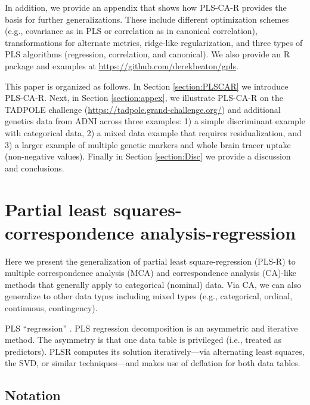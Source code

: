 \documentclass[12pt]{article}
\begin{document}
In addition, we provide an appendix that shows how PLS-CA-R provides the
basis for further generalizations. These include different optimization
schemes (e.g., covariance as in PLS or correlation as in canonical
correlation), transformations for alternate metrics, ridge-like
regularization, and three types of PLS algorithms (regression,
correlation, and canonical). We also provide an R package and examples
at \url{https://github.com/derekbeaton/gpls}.

This paper is organized as follows. In Section \ref{section:PLSCAR} we
introduce PLS-CA-R. Next, in Section \ref{section:appex}, we illustrate
PLS-CA-R on the TADPOLE challenge
(\url{https://tadpole.grand-challenge.org/}) and additional genetics
data from ADNI across three examples: 1) a simple discriminant example
with categorical data, 2) a mixed data example that requires
residualization, and 3) a larger example of multiple genetic markers and
whole brain tracer uptake (non-negative values). Finally in Section
\ref{section:Disc} we provide a discussion and conclusions.

\hypertarget{partial-least-squares-correspondence-analysis-regression}{%
\section{Partial least squares-correspondence
analysis-regression}\label{partial-least-squares-correspondence-analysis-regression}}

\label{section:PLSCAR}

Here we present the generalization of partial least square-regression
(PLS-R) to multiple correspondence analysis (MCA) and correspondence
analysis (CA)-like methods that generally apply to categorical (nominal)
data. Via CA, we can also generalize to other data types including mixed
types (e.g., categorical, ordinal, continuous, contingency).

PLS ``regression''
\citep{wold_soft_1975, wold_collinearity_1984, wold_pls-regression_2001}.
PLS regression decomposition is an asymmetric and iterative method. The
asymmetry is that one data table is privileged (i.e., treated as
predictors). PLSR computes its solution iteratively---via alternating
least squares, the SVD, or similar techniques---and makes use of
deflation for both data tables.

\hypertarget{notation}{%
\subsection{Notation}\label{notation}}
\end{document}
